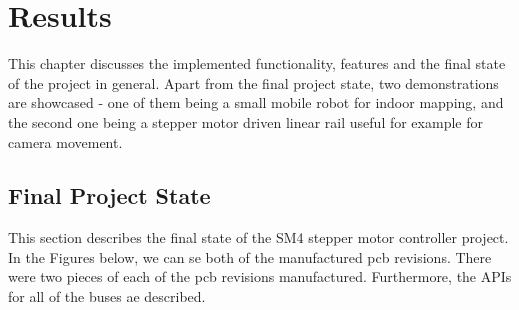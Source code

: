\chapter{Results}
\label{ch:results}
This chapter discusses the implemented functionality, features and the final state of the project in general.
Apart from the final project state, two demonstrations are showcased - one of them being a small mobile robot for indoor mapping, and the second one being a stepper motor driven linear rail useful for example for camera movement.

\section{Final Project State}
\label{sec:final_project_state}
This section describes the final state of the SM4 stepper motor controller project.
In the Figures below, we can se both of the manufactured \acs{pcb} revisions.
There were two pieces of each of the \acs{pcb} revisions manufactured.
Furthermore, the \acs{API}s for all of the buses ae described.


